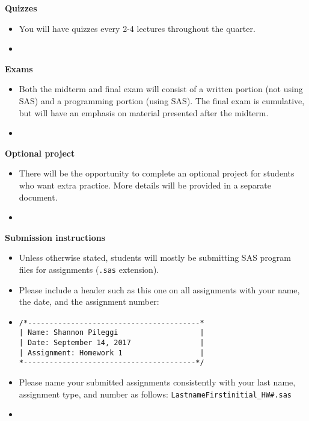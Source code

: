 \documentclass[letterpaper,12pt]{report}
\begin{document}
\textbf{Quizzes}
\begin{itemize}
\item[]
You will have quizzes every 2-4 lectures throughout the quarter.
\item[]
\end{itemize}

\textbf{Exams}
\begin{itemize}
\item[]
Both the midterm and final exam will consist of a written portion (not using SAS) and a programming portion (using SAS).  The final exam is cumulative, but will have an emphasis on material presented after the midterm.
\item[]
\end{itemize}

\textbf{Optional project}
\begin{itemize}
\item[]
There will be the opportunity to complete an optional project for students who want extra practice.  More details will be provided in a separate document.
\item[]
\end{itemize}

\clearpage
\textbf{Submission instructions}
\begin{itemize}
\item
Unless otherwise stated, students will mostly be submitting SAS program files for assignments (\texttt{.sas} extension).
\item
Please include a header such as this one on all assignments with your name, the date, and the assignment number:
\item[]
\begin{verbatim}
/*----------------------------------------*
| Name: Shannon Pileggi                   |
| Date: September 14, 2017                |
| Assignment: Homework 1                  |
*----------------------------------------*/
\end{verbatim}
\item
Please name your submitted assignments consistently with your last name, assignment type, and number as follows: \texttt{LastnameFirstinitial\_HW\#.sas}
\item[]
\end{itemize}
\end{document}
